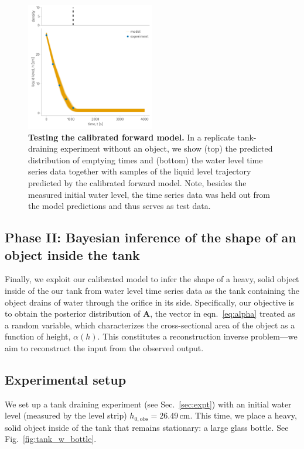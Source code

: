 \documentclass[openacc]{rsproca_new}%
\begin{document}
\begin{figure}[h!]
    \centering
    	\includegraphics[width=0.5\textwidth]{../test.pdf}
    \caption{
      \textbf{Testing the calibrated forward model.}
      In a replicate tank-draining experiment without an object, we show (top) the predicted distribution of emptying times and (bottom) the water level time series data together with samples of the liquid level trajectory predicted by the calibrated forward model. Note, besides the measured initial water level, the time series data was held out from the model predictions and thus serves as test data.
      } \label{fig:test}
\end{figure}

\subsection{Phase II: Bayesian inference of the shape of an object inside the tank}
Finally, we exploit our calibrated model to infer the shape of a heavy, solid object inside of the our tank from water level time series data as the tank containing the object drains of water through the orifice in its side.
Specifically, our objective is to obtain the posterior distribution of $\mathbf{A}$, the vector in eqn.~\ref{eq:alpha} treated as a random variable, which characterizes the cross-sectional area of the object as a function of height, $\alpha(h)$.
This constitutes a reconstruction inverse problem---we aim to reconstruct the input from the observed output.

\subsection{Experimental setup}
We set up a tank draining experiment (see Sec.~\ref{sec:expt}) with an initial water level (measured by the level strip) $h_{0, \text{obs}}=26.49$\,cm. 
This time, we place a heavy, solid object inside of the tank that remains stationary: a large glass bottle. 
See Fig.~\ref{fig:tank_w_bottle}.
\end{document}
